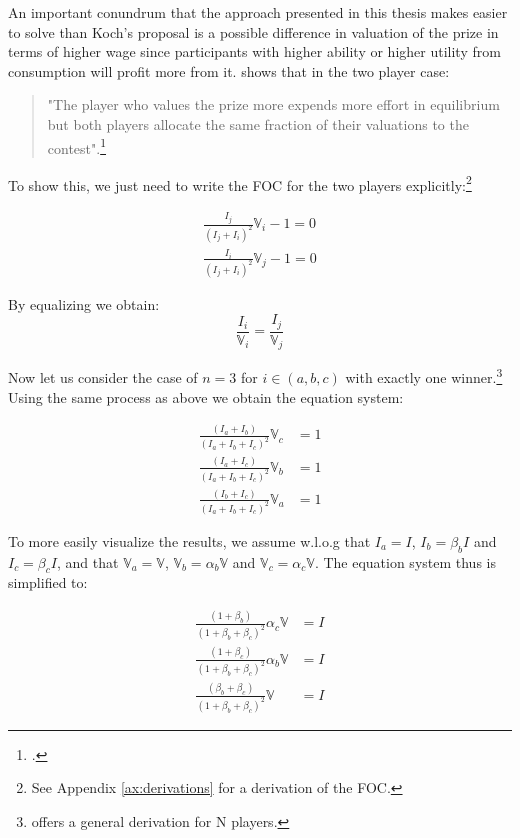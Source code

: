 \begin{appendices}
An important conundrum that the approach presented in this thesis makes easier to solve than Koch's proposal \cite{koch2017} is a possible difference in valuation of the prize in terms of higher wage since participants with higher ability or higher utility from consumption will profit more from it. \cite{nti1999} shows that in the two player case:\\

\begin{quote}
    "The player who values the prize more expends more effort in equilibrium but both players allocate the same fraction of their valuations to the contest".\footnote{\citet[p.~419]{nti1999}.}
\end{quote}

To show this, we just need to write the FOC for the two players explicitly:\footnote{See Appendix \ref{ax:derivations} for a derivation of the FOC.}

\begin{equation*}
\begin{split}
    \frac{I_j}{(I_j + I_i)^2}\mathbb{V}_i-1 = 0 \\
    \frac{I_i}{(I_j + I_i)^2}\mathbb{V}_j-1 = 0
\end{split}
\end{equation*}

By equalizing we obtain:
\begin{equation}
    \frac{I_i}{\mathbb{V}_i} = \frac{I_j}{\mathbb{V}_j} 
\end{equation}

Now let us consider the case of $n=3$ for $i \in (a,b,c)$ with exactly one winner.\footnote{\cite{stein2002} offers a general derivation for N players.} Using the same process as above we obtain the equation system:

\begin{align}
    \frac{(I_a+I_b)}{(I_a+I_b+I_c)^2}\mathbb{V}_c&=1\\
    \frac{(I_a+I_c)}{(I_a+I_b+I_c)^2}\mathbb{V}_b&=1\\
    \frac{(I_b+I_c)}{(I_a+I_b+I_c)^2}\mathbb{V}_a&=1
\end{align}

To more easily visualize the results, we assume w.l.o.g that $I_a = I$, $I_b = \beta_b I$ and $ I_c = \beta_c I $, and that $\mathbb{V}_a = \mathbb{V}$, $\mathbb{V}_b = \alpha_b \mathbb{V} $ and $\mathbb{V}_c = \alpha_c \mathbb{V}$. The equation system thus is simplified to:

\begin{align}
    \label{eq:sys1}\frac{(1+\beta_b)}{(1+\beta_b+ \beta_c )^2}\alpha_c\mathbb{V}&=I\\
    \label{eq:sys2}\frac{(1+\beta_c )}{(1+\beta_b  + \beta_c )^2}\alpha_b\mathbb{V}&=I\\
    \label{eq:sys3}\frac{(\beta_b +\beta_c )}{(1+\beta_b  + \beta_c )^2}\mathbb{V}&=I
\end{align}


\end{appendices}
